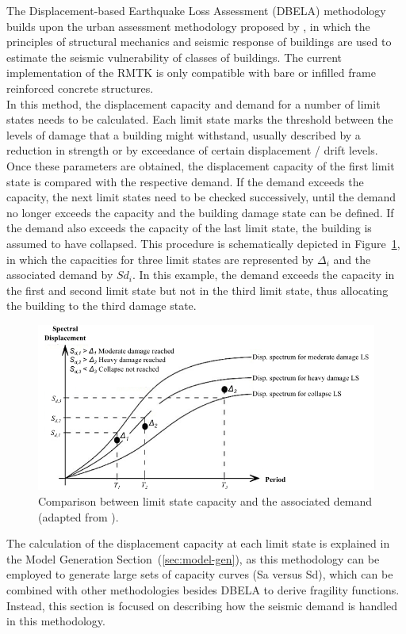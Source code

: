 The Displacement-based Earthquake Loss Assessment (DBELA) methodology builds upon the urban assessment methodology proposed by \cite{Calvi1999}, in which the principles of structural mechanics and seismic response of buildings are used to estimate the seismic vulnerability of classes of buildings. The current implementation of the RMTK is only compatible with bare or infilled frame reinforced concrete structures.\\

In this method, the displacement capacity and demand for a number of limit states needs to be calculated. Each limit state marks the threshold between the levels of damage that a building might withstand, usually described by a reduction in strength or by exceedance of certain displacement / drift levels. Once these parameters are obtained, the displacement capacity of the first limit state is compared with the respective demand. If the demand exceeds the capacity, the next limit states need to be checked successively, until the demand no longer exceeds the capacity and the building damage state can be defined. If the demand also exceeds the capacity of the last limit state, the building is assumed to have collapsed. This procedure is schematically depicted in Figure~\ref{fig:DBELA_scheme}, in which the capacities for three limit states are represented by $\Delta_i$ and the associated demand by $Sd_i$. In this example, the demand exceeds the capacity in the first and second limit state but not in the third limit state, thus allocating the building to the third damage state.

\begin{figure}[htb]
  \centering
      \includegraphics[width=12cm]{Figures/DBELA_scheme.png}
  \caption{Comparison between limit state capacity and the associated demand (adapted from \cite{BalEtAl2010}).}
  \label{fig:DBELA_scheme}
\end{figure}

The calculation of the displacement capacity at each limit state is explained in the Model Generation Section~(\ref{sec:model-gen}), as this methodology can be employed to generate large sets of capacity curves (Sa versus Sd), which can be combined with other methodologies besides DBELA to derive fragility functions. Instead, this section is focused on describing how the seismic demand is handled in this methodology.\\

